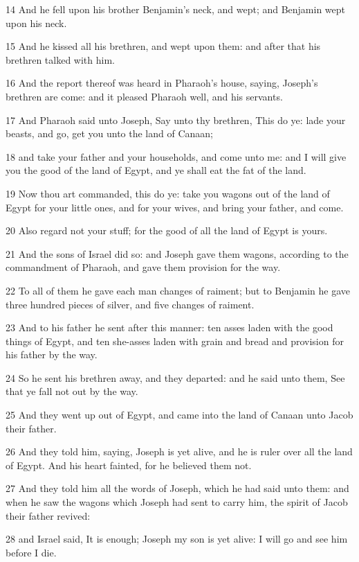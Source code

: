 \par 14 And he fell upon his brother Benjamin's neck, and wept; and Benjamin wept upon his neck.
\par 15 And he kissed all his brethren, and wept upon them: and after that his brethren talked with him.
\par 16 And the report thereof was heard in Pharaoh's house, saying, Joseph's brethren are come: and it pleased Pharaoh well, and his servants.
\par 17 And Pharaoh said unto Joseph, Say unto thy brethren, This do ye: lade your beasts, and go, get you unto the land of Canaan;
\par 18 and take your father and your households, and come unto me: and I will give you the good of the land of Egypt, and ye shall eat the fat of the land.
\par 19 Now thou art commanded, this do ye: take you wagons out of the land of Egypt for your little ones, and for your wives, and bring your father, and come.
\par 20 Also regard not your stuff; for the good of all the land of Egypt is yours.
\par 21 And the sons of Israel did so: and Joseph gave them wagons, according to the commandment of Pharaoh, and gave them provision for the way.
\par 22 To all of them he gave each man changes of raiment; but to Benjamin he gave three hundred pieces of silver, and five changes of raiment.
\par 23 And to his father he sent after this manner: ten asses laden with the good things of Egypt, and ten she-asses laden with grain and bread and provision for his father by the way.
\par 24 So he sent his brethren away, and they departed: and he said unto them, See that ye fall not out by the way.
\par 25 And they went up out of Egypt, and came into the land of Canaan unto Jacob their father.
\par 26 And they told him, saying, Joseph is yet alive, and he is ruler over all the land of Egypt. And his heart fainted, for he believed them not.
\par 27 And they told him all the words of Joseph, which he had said unto them: and when he saw the wagons which Joseph had sent to carry him, the spirit of Jacob their father revived:
\par 28 and Israel said, It is enough; Joseph my son is yet alive: I will go and see him before I die.

